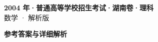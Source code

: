 \documentclass[zihao=-4, a4paper]{ctexart}
\begin{document}
\begin{center}
  {\Large\bfseries 2004 年·普通高等学校招生考试·湖南卷·理科}\\[4pt]
  {\large 数学 · 解析版}
\end{center}
\medskip
{}

\clearpage
{}
\begin{center}{\Large\bfseries 参考答案与详细解析}\end{center}
\medskip

\end{document}
